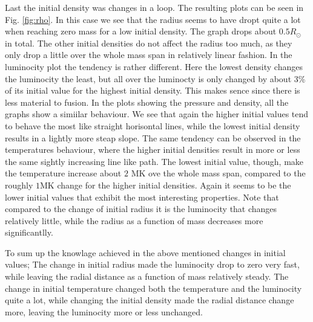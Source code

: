 \documentclass{emulateapj}
\begin{document}
	Last the initial density was changes in a loop. The resulting plots can be seen in Fig. \ref{fig:rho}. In this case we see that the radius seems to have dropt quite a lot when reaching zero mass for a low initial density. The graph drops about $0.5R_\odot$ in total. The other initial densities do not affect the radius too much, as they only drop a little over the whole mass span in relatively linear fashion. In the luminocity plot the tendency is rather different. Here the lowest density changes the luminocity the least, but all over the luminocty is only changed by about 3\% of its initial value for the highest initial density. This makes sence since there is less material to fusion. In the plots showing the pressure and density, all the graphs show a simiilar behaviour. We see that again the higher initial values tend to behave the most like straight horisontal lines, while the lowest initial density results in a lightly more steap slope. The same tendency can be observed in the temperatures behaviour, where the higher initial densities result in more or less the same sightly increasing line like path. The lowest initial value, though, make the temperature increase about $2$ MK ove the whole mass span, compared to the roughly $1$MK change for the higher initial densities. Again it seems to be the lower initial values that exhibit the most interesting properties. Note that compared to the change of initial radius it is the luminocity that changes relatively little, while the radius as a function of mass decreases more significantlly.
	
	To sum up the knowlage achieved in the above mentioned changes in initial values; The change in initial radius made the luminocity drop to zero very fast, while leaving the radial distance as a function of mass relatively steady. The change in initial temperature changed both the temperature and the luminocity quite a lot, while changing the initial density made the radial distance change more, leaving the luminocity more or less unchanged.
	
\end{document}
